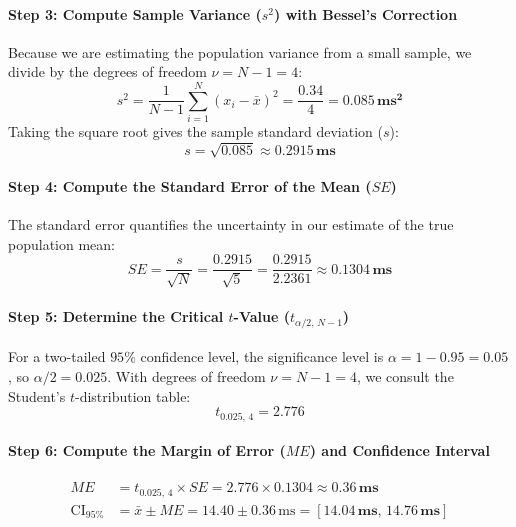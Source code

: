 \begin{example}
\paragraph{Step 3: Compute Sample Variance ($s^2$) with Bessel's Correction}
Because we are estimating the population variance from a small sample, we divide by the degrees of freedom $\nu = N - 1 = 4$:
\begin{equation*}
s^2 = \frac{1}{N - 1} \sum_{i=1}^{N} (x_i - \bar{x})^2 = \frac{0.34}{4} = \mathbf{0.085\,\text{ms}^2}
\end{equation*}
Taking the square root gives the sample standard deviation ($s$):
\begin{equation*}
s = \sqrt{0.085} \approx \mathbf{0.2915\,\text{ms}}
\end{equation*}

\paragraph{Step 4: Compute the Standard Error of the Mean ($SE$)}
The standard error quantifies the uncertainty in our estimate of the true population mean:
\begin{equation*}
SE = \frac{s}{\sqrt{N}} = \frac{0.2915}{\sqrt{5}} = \frac{0.2915}{2.2361} \approx \mathbf{0.1304\,\text{ms}}
\end{equation*}

\paragraph{Step 5: Determine the Critical $t$-Value ($t_{\alpha/2, \, N-1}$)}
For a two-tailed $95\%$ confidence level, the significance level is $\alpha = 1 - 0.95 = 0.05$, so $\alpha/2 = 0.025$. With degrees of freedom $\nu = N - 1 = 4$, we consult the Student's $t$-distribution table:
\begin{equation*}
t_{0.025, \, 4} = \mathbf{2.776}
\end{equation*}

\paragraph{Step 6: Compute the Margin of Error ($ME$) and Confidence Interval}
\begin{align*}
ME &= t_{0.025, \, 4} \times SE = 2.776 \times 0.1304 \approx \mathbf{0.36\,\text{ms}} \\
\text{CI}_{95\%} &= \bar{x} \pm ME = 14.40 \pm 0.36\,\text{ms} = [\mathbf{14.04\,\text{ms}}, \, \mathbf{14.76\,\text{ms}}]
\end{align*}


\end{example}
